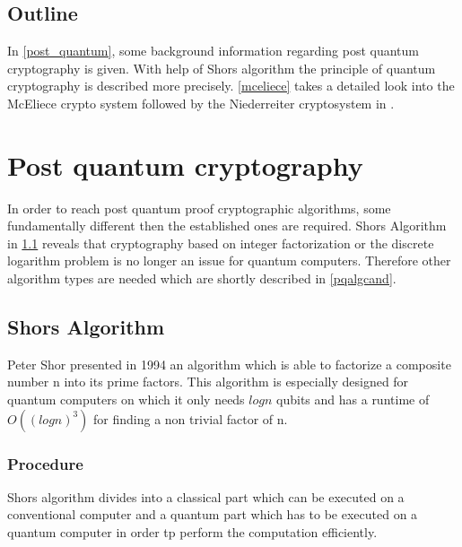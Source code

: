 \subsection*{Outline}
In \autoref{post_quantum}, some background information regarding post quantum cryptography is given. With help of Shors algorithm the principle of quantum cryptography is described more precisely. \autoref{mceliece} takes a detailed look into the McEliece crypto system followed by the Niederreiter cryptosystem in . 


\section{Post quantum cryptography}
\label{post_quantum}
In order to reach post quantum proof cryptographic algorithms, some fundamentally different then the established ones are required. Shors Algorithm in \ref{shoor} reveals that cryptography based on integer factorization or the discrete logarithm problem is no longer an issue for quantum computers. Therefore other algorithm types are needed which are shortly described in \ref{pqalgcand}.   

\subsection{Shors Algorithm}
\label{shoor}
Peter Shor presented in 1994 an algorithm which is able to factorize a composite number n into its prime factors. This algorithm is especially designed for quantum computers on which it only needs $log n$ qubits and has a runtime of $O((log n)^3)$ for finding a non trivial factor of n. 



\subsubsection{Procedure}
Shors algorithm divides into a classical part which can be executed on a conventional computer and a quantum part which has to be executed on a quantum computer in order tp perform the computation efficiently. 


